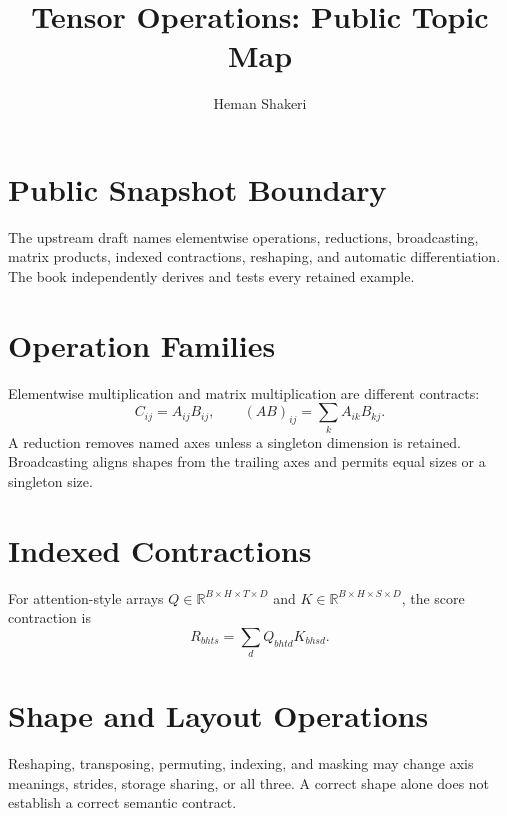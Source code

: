 \documentclass{article}
\title{Tensor Operations: Public Topic Map}
\author{Heman Shakeri}
\date{}
\begin{document}
\maketitle

\section*{Public Snapshot Boundary}

The upstream draft names elementwise operations, reductions, broadcasting, matrix
products, indexed contractions, reshaping, and automatic differentiation. The book
independently derives and tests every retained example.

\section{Operation Families}

Elementwise multiplication and matrix multiplication are different contracts:
\[
  C_{ij}=A_{ij}B_{ij},
  \qquad
  (AB)_{ij}=\sum_k A_{ik}B_{kj}.
\]
A reduction removes named axes unless a singleton dimension is retained. Broadcasting
aligns shapes from the trailing axes and permits equal sizes or a singleton size.

\section{Indexed Contractions}

For attention-style arrays
$Q\in\mathbb{R}^{B\times H\times T\times D}$ and
$K\in\mathbb{R}^{B\times H\times S\times D}$, the score contraction is
\[
  R_{bhts}=\sum_d Q_{bhtd}K_{bhsd}.
\]

\section{Shape and Layout Operations}

Reshaping, transposing, permuting, indexing, and masking may change axis meanings,
strides, storage sharing, or all three. A correct shape alone does not establish a
correct semantic contract.

\end{document}
